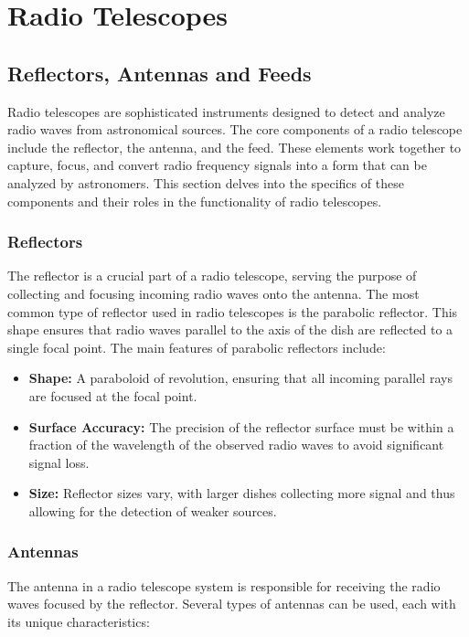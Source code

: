\chapter{Radio Telescopes}

\section{Reflectors, Antennas and Feeds}

Radio telescopes are sophisticated instruments designed to detect and analyze radio waves from astronomical sources. The core components of a radio telescope include the reflector, the antenna, and the feed. These elements work together to capture, focus, and convert radio frequency signals into a form that can be analyzed by astronomers. This section delves into the specifics of these components and their roles in the functionality of radio telescopes.

\subsection{Reflectors}

The reflector is a crucial part of a radio telescope, serving the purpose of collecting and focusing incoming radio waves onto the antenna. The most common type of reflector used in radio telescopes is the parabolic reflector. This shape ensures that radio waves parallel to the axis of the dish are reflected to a single focal point. The main features of parabolic reflectors include:

\begin{itemize}
    \item \textbf{Shape:} A paraboloid of revolution, ensuring that all incoming parallel rays are focused at the focal point.
    \item \textbf{Surface Accuracy:} The precision of the reflector surface must be within a fraction of the wavelength of the observed radio waves to avoid significant signal loss.
    \item \textbf{Size:} Reflector sizes vary, with larger dishes collecting more signal and thus allowing for the detection of weaker sources.
\end{itemize}

\subsection{Antennas}

The antenna in a radio telescope system is responsible for receiving the radio waves focused by the reflector. Several types of antennas can be used, each with its unique characteristics:

